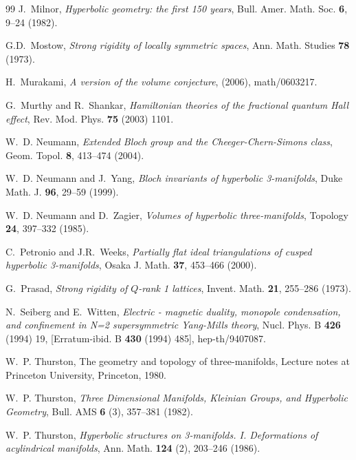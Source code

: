 \documentclass[hyper]{JHEP3}
\begin{document}
\begin{thebibliography}{99}
J.~Milnor, \textsl{ Hyperbolic geometry: the first 150 years},
\newblock Bull. Amer. Math. Soc. \textbf{ 6}, 9--24 (1982).

G.D.~Mostow, \textsl{ Strong rigidity of locally symmetric spaces},
\newblock Ann. Math. Studies \textbf{ 78} (1973).

H.~Murakami, \textsl{ A version of the volume conjecture},
\newblock (2006), {math/0603217}.

G.~Murthy and R.~Shankar,
\textsl{ Hamiltonian theories of the fractional quantum Hall effect},
\newblock Rev. Mod. Phys.  \textbf{75} (2003) 1101.

W.~D. Neumann, \textsl{ Extended Bloch group and the Cheeger-Chern-Simons class}, \newblock Geom. Topol. \textbf{ 8}, 413--474 (2004).

W.~D. Neumann and J.~Yang, \textsl{ Bloch invariants of hyperbolic 3-manifolds}, \newblock Duke Math. J. \textbf{ 96}, 29--59 (1999).

W.~D. Neumann and D.~Zagier, \textsl{ Volumes of hyperbolic three-manifolds},
\newblock Topology \textbf{ 24}, 397--332 (1985).

C.~Petronio and J.R.~Weeks,
\textsl{ Partially flat ideal triangulations of cusped hyperbolic 3-manifolds},
\newblock Osaka J. Math.   \textbf{37}, 453--466 (2000).

G.~Prasad, \textsl{ Strong rigidity of $Q$-rank 1 lattices},
\newblock Invent. Math. \textbf{ 21}, 255--286 (1973).

N.~Seiberg and E.~Witten, \textsl{ Electric - magnetic duality,
monopole condensation, and confinement in N=2 supersymmetric Yang-Mills theory},
\newblock Nucl. Phys. B \textbf{ 426} (1994) 19, [Erratum-ibid.  B \textbf{ 430} (1994) 485],
{hep-th/9407087}.

W.~P. Thurston,
\newblock The geometry and topology of three-manifolds,
\newblock Lecture notes at Princeton University, Princeton, 1980.

W.~P. Thurston, \textsl{ Three Dimensional Manifolds, Kleinian Groups, and Hyperbolic Geometry},
\newblock Bull. AMS \textbf{ 6} (3), 357--381 (1982).

W.~P. Thurston, \textsl{ Hyperbolic structures on 3-manifolds. I. Deformations of acylindrical manifolds},
\newblock Ann. Math. \textbf{ 124} (2), 203--246 (1986).


\end{thebibliography}
\end{document}
